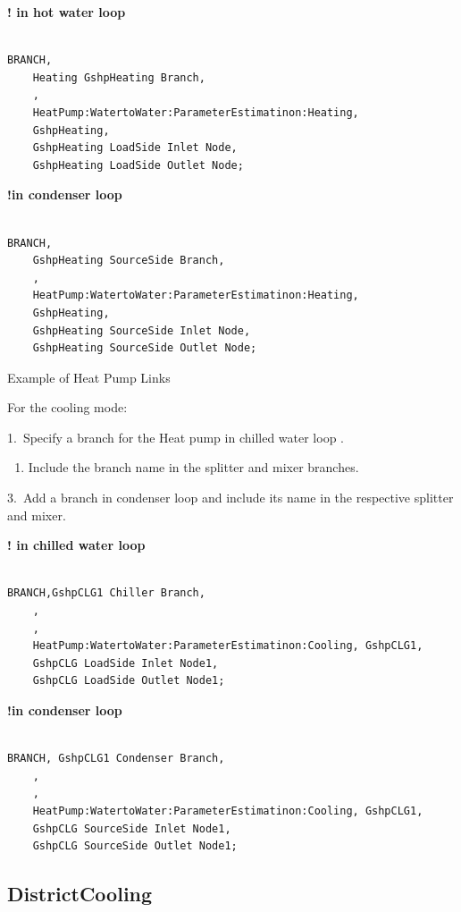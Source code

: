 \textbf{! in hot water loop}

\begin{lstlisting}

BRANCH,
	Heating GshpHeating Branch,
    ,
    HeatPump:WatertoWater:ParameterEstimatinon:Heating,
    GshpHeating,
    GshpHeating LoadSide Inlet Node,
    GshpHeating LoadSide Outlet Node;
\end{lstlisting}

\textbf{!in condenser loop}

\begin{lstlisting}

BRANCH,
	GshpHeating SourceSide Branch,
    ,
    HeatPump:WatertoWater:ParameterEstimatinon:Heating,
    GshpHeating,
    GshpHeating SourceSide Inlet Node,
    GshpHeating SourceSide Outlet Node;
\end{lstlisting}

Example of Heat Pump Links

For the cooling mode:

1.~Specify a branch for the Heat pump in chilled water loop .

\begin{enumerate}
    \def\labelenumi{\arabic{enumi}.}
    \setcounter{enumi}{1}
    \tightlist
    \item
    Include the branch name in the splitter and mixer branches.
\end{enumerate}

3.~Add a branch in condenser loop and include its name in the respective splitter and mixer.

\textbf{! in chilled water loop}

\begin{lstlisting}

BRANCH,GshpCLG1 Chiller Branch,
    ,
    ,
    HeatPump:WatertoWater:ParameterEstimatinon:Cooling, GshpCLG1,
    GshpCLG LoadSide Inlet Node1,
    GshpCLG LoadSide Outlet Node1;
\end{lstlisting}

\textbf{!in condenser loop}

\begin{lstlisting}

BRANCH, GshpCLG1 Condenser Branch,
    ,
    ,
    HeatPump:WatertoWater:ParameterEstimatinon:Cooling, GshpCLG1,
    GshpCLG SourceSide Inlet Node1,
    GshpCLG SourceSide Outlet Node1;
\end{lstlisting}

\subsection{DistrictCooling}\label{districtcooling}

